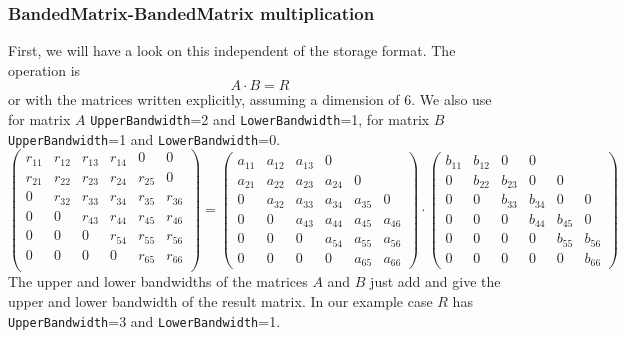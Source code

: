 \subsubsection{BandedMatrix-BandedMatrix multiplication}
First, we will have a look on this independent of the storage
format. The operation is 
\begin{displaymath}
  A\cdot B = R
\end{displaymath}
or with the matrices written explicitly, assuming a dimension of 6. We
also use for matrix $A$ \texttt{UpperBandwidth}=2 and
\texttt{LowerBandwidth}=1, for matrix $B$ \texttt{UpperBandwidth}=1
and \texttt{LowerBandwidth}=0.
\begin{equation}
  \label{eq:bmatbmatbmat}
  \left(\begin{array}{cccccc}
    r_{11} &r_{12} &r_{13}& r_{14} & 0 & 0\\
    r_{21} &r_{22} &r_{23}& r_{24} & r_{25} & 0\\
    0 &r_{32} &r_{33}& r_{34} & r_{35} & r_{36}\\\hline
    0 & 0 &r_{43}& r_{44} & r_{45} & r_{46} \\
    0 & 0 & 0 & r_{54} & r_{55} & r_{56} \\
    0 & 0 & 0 & 0 & r_{65} & r_{66}\\
  \end{array}\right) =
  \left(\begin{array}{cccccc}
    a_{11} &a_{12} &a_{13}& 0\\
    a_{21} &a_{22} &a_{23}& a_{24} & 0\\
    0 &a_{32} &a_{33}& a_{34} & a_{35} & 0\\\hline
    0 & 0 &a_{43} &a_{44}& a_{45} & a_{46} \\
    0 & 0 &0 &a_{54} &a_{55}& a_{56}\\
    0 & 0 & 0 &0 &a_{65} &a_{66}
  \end{array}\right)
\cdot
  \left(\begin{array}{cccccc}
    b_{11} &b_{12} & 0 & 0\\
    0 &b_{22} &b_{23}& 0 & 0\\
    0 & 0 &b_{33}& b_{34} & 0 & 0\\\hline
    0 & 0 & 0 &b_{44}& b_{45} & 0 \\
    0 & 0 & 0 & 0 &b_{55}& b_{56}\\
    0 & 0 & 0 & 0 & 0 &b_{66}
  \end{array}\right)
\end{equation}
The upper and lower bandwidths of the matrices $A$ and $B$ just add
and give the upper and lower bandwidth of the result matrix. In our
example case $R$ has \texttt{UpperBandwidth}=3 and
\texttt{LowerBandwidth}=1. 

